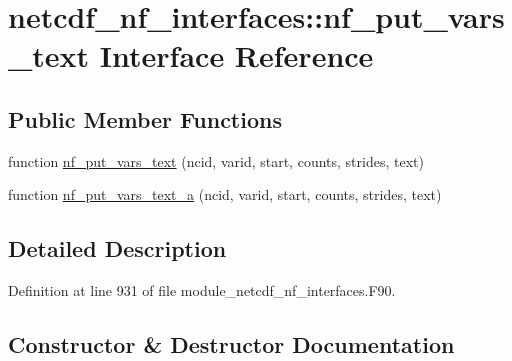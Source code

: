 \hypertarget{interfacenetcdf__nf__interfaces_1_1nf__put__vars__text}{}\section{netcdf\+\_\+nf\+\_\+interfaces\+:\+:nf\+\_\+put\+\_\+vars\+\_\+text Interface Reference}
\label{interfacenetcdf__nf__interfaces_1_1nf__put__vars__text}
\subsection*{Public Member Functions}
\begin{DoxyCompactItemize}
\item 
function \hyperlink{interfacenetcdf__nf__interfaces_1_1nf__put__vars__text_a4e2733768f6e0a3136bd2eee2f45cb80}{nf\+\_\+put\+\_\+vars\+\_\+text} (ncid, varid, start, counts, strides, text)
\item 
function \hyperlink{interfacenetcdf__nf__interfaces_1_1nf__put__vars__text_aba67f9140ae2f7a18a21ea3c60c45bb6}{nf\+\_\+put\+\_\+vars\+\_\+text\+\_\+a} (ncid, varid, start, counts, strides, text)
\end{DoxyCompactItemize}


\subsection{Detailed Description}


Definition at line 931 of file module\+\_\+netcdf\+\_\+nf\+\_\+interfaces.\+F90.



\subsection{Constructor \& Destructor Documentation}
\mbox{\label{interfacenetcdf__nf__interfaces_1_1nf__put__vars__text_a4e2733768f6e0a3136bd2eee2f45cb80}} 
